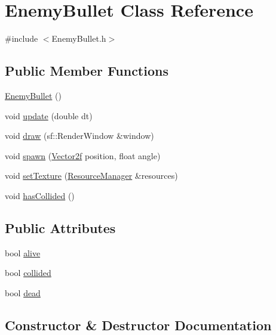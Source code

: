 \hypertarget{class_enemy_bullet}{}\section{Enemy\+Bullet Class Reference}
\label{class_enemy_bullet}


{\ttfamily \#include $<$Enemy\+Bullet.\+h$>$}

\subsection*{Public Member Functions}
\begin{DoxyCompactItemize}
\item 
\mbox{\hyperlink{class_enemy_bullet_ad412518e8a4b8bb79806caf6ba79ed6d}{Enemy\+Bullet}} ()
\item 
void \mbox{\hyperlink{class_enemy_bullet_a127b1d58aa26ac06559f7cebf183b940}{update}} (double dt)
\item 
void \mbox{\hyperlink{class_enemy_bullet_a8c46608c19627f2ed50882506b43d9bd}{draw}} (sf\+::\+Render\+Window \&window)
\item 
void \mbox{\hyperlink{class_enemy_bullet_a71bda569adc832b5438b2452942a7246}{spawn}} (\mbox{\hyperlink{class_vector2f}{Vector2f}} position, float angle)
\item 
void \mbox{\hyperlink{class_enemy_bullet_a48615a287b12f7abcc70a8454a49fb84}{set\+Texture}} (\mbox{\hyperlink{class_resource_manager}{Resource\+Manager}} \&resources)
\item 
void \mbox{\hyperlink{class_enemy_bullet_ad91b04f76ddc0f1d2f26f3dd4d78576f}{has\+Collided}} ()
\end{DoxyCompactItemize}
\subsection*{Public Attributes}
\begin{DoxyCompactItemize}
\item 
bool \mbox{\hyperlink{class_enemy_bullet_a0e3d53bac30ca999801134e4a3d04ad0}{alive}}
\item 
bool \mbox{\hyperlink{class_enemy_bullet_a562c7fa519326360d6a4909367b68108}{collided}}
\item 
bool \mbox{\hyperlink{class_enemy_bullet_a0dfe3d06058023f6c5baf3c5fab4acbc}{dead}}
\end{DoxyCompactItemize}


\subsection{Constructor \& Destructor Documentation}
\mbox{\label{class_enemy_bullet_ad412518e8a4b8bb79806caf6ba79ed6d}} 
